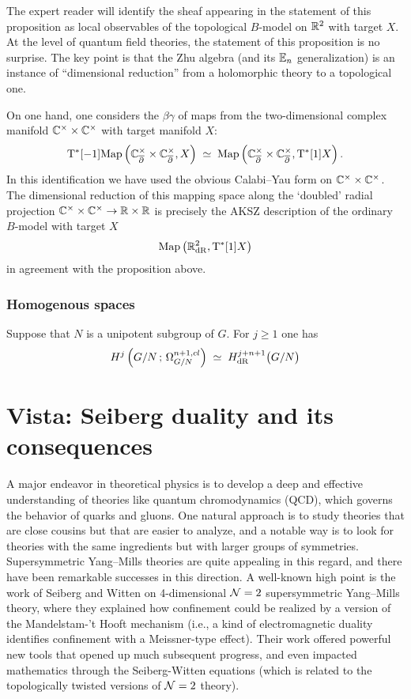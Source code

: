 \documentclass[11pt]{amsart}
\begin{document}
The expert reader will identify the sheaf appearing in the statement of this proposition as local observables of the topological $B$-model on $\mathbb R^2$ with target $X$. 
At the level of quantum field theories, the statement of this proposition is no surprise. 
The key point is that the Zhu algebra (and its $\mathbb E_n$ generalization) is an instance of ``dimensional reduction'' from a holomorphic theory to a topological one. 

On one hand, one considers the $\beta\gamma$ of maps from the two-dimensional complex manifold $\mathbb C^\times \times \mathbb C^\times$ with target manifold $X$:
\[
{\rm T}^*[-1] {\rm Map}\left(\mathbb C_{\overline{\partial}}^\times \times \mathbb C_{\overline{\partial}}^\times , X\right) \; \simeq \; {\rm Map}\left(\mathbb C_{\overline{\partial}}^\times \times \mathbb C_{\overline{\partial}}^\times , {\rm T}^*[1] X\right) .
\]
In this identification we have used the obvious Calabi--Yau form on $\mathbb C^\times \times \mathbb C^\times$. 
The dimensional reduction of this mapping space along the `doubled' radial projection $\mathbb C^\times \times \mathbb C^\times \to \mathbb R \times \mathbb R$ is precisely the AKSZ description of the ordinary $B$-model with target $X$
\[
{\rm Map}\left(\mathbb R^2_{\rm dR} , {\rm T}^*[1] X\right)
\]
in agreement with the proposition above.


\subsubsection{Homogenous spaces}

Suppose that $N$ is a unipotent subgroup of $G$.
For $j \geq 1$ one has
\[
H^j \left( G / N \, ; \, \Omega^{n+1,cl}_{G/N} \right) \; \simeq \; H_{\rm dR}^{j+n+1} \big(G / N \big)
\]


\section{Vista: Seiberg duality and its consequences}
\label{sec: seiberg}

A major endeavor in theoretical physics is to develop a deep and effective understanding of theories like quantum chromodynamics (QCD), which governs the behavior of quarks and gluons.
One natural approach is to study theories that are close cousins but that are easier to analyze,
and a notable way is to look for theories with the same ingredients but with larger groups of symmetries.
Supersymmetric Yang--Mills theories are quite appealing in this regard,
and there have been remarkable successes in this direction.
A well-known high point is the work of Seiberg and Witten on 4-dimensional $\mathcal N =2$ supersymmetric Yang--Mills theory,
where they explained how confinement could be realized by a version of the Mandelstam-'t Hooft mechanism (i.e., a kind of electromagnetic duality identifies confinement with a Meissner-type effect).
Their work offered powerful new tools that opened up much subsequent progress,
and even impacted mathematics through the Seiberg-Witten equations (which is related to the topologically twisted versions of $\mathcal N=2$ theory).
\end{document}
